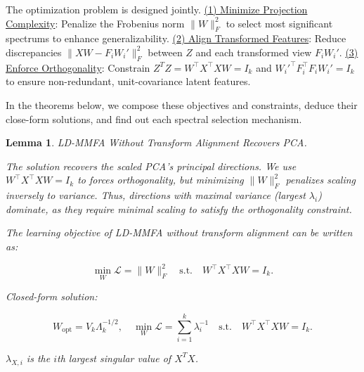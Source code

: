\documentclass{article}
\newtheorem{lemma}{Lemma} %
\begin{document}
The optimization problem is designed jointly.
\underline{(1) Minimize Projection Complexity}: Penalize the Frobenius norm \( \|W\|_F^2 \) to select most significant spectrums to enhance generalizability.  
\underline{(2) Align Transformed Features}: Reduce discrepancies \( \|XW - F_i W_i'\|_F^2 \) between \( Z \) and each transformed view \( F_i W_i' \).  
\underline{(3) Enforce Orthogonality}: Constrain \( Z^TZ= W^\top X^\top X W = I_k \) and \( W_i'^\top F_i^\top F_i W_i' = I_k \) to ensure non-redundant, unit-covariance latent features.  

In the theorems below, we compose these objectives and constraints, deduce their close-form solutions, and find out each spectral selection mechanism.


    
\begin{lemma}\label{lem:PCA}LD-MMFA Without Transform Alignment Recovers PCA.

The solution recovers the scaled PCA’s principal directions. We use \( W^\top X^\top X W = I_k \) to forces orthogonality, but minimizing \( \|W\|_F^2 \) penalizes scaling inversely to variance. Thus, directions with maximal variance (largest \( \lambda_i \)) dominate, as they require minimal scaling to satisfy the orthogonality constraint.

The learning objective of LD-MMFA without transform alignment can be written as:

\begin{equation}
    \min_{W} \mathcal{L} = \|W\|_F^2 \quad \text{s.t.} \quad W^\top X^\top X W = I_k.
\end{equation}

Closed-form solution:  

\begin{equation}    
    W_{\text{opt}} = V_k \Lambda_k^{-1/2}, \quad \min_{W} \mathcal{L} = \sum_{i = 1}^k \lambda_{i}^{-1} \quad \text{s.t.} \quad W^\top X^\top X W = I_k.
\end{equation}

$\lambda_{X,i}$ is the $i$th largest singular value of $X^TX$.


\end{lemma}
\end{document}
